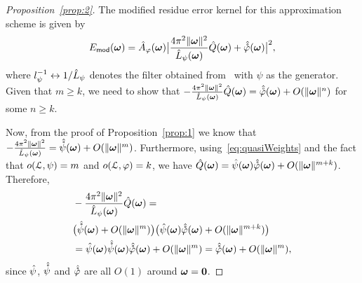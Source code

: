 \begin{proof}[Proposition~\ref{prop:2}]
  The modified residue error kernel for this approximation scheme is given by
  \begin{equation*}
    E_{\mathsf{mod}}(\boldsymbol{\omega}) = 
    \hat{A}_{\varphi}(\boldsymbol{\omega})
    \bigl\lvert
      \frac{4\pi^2 \lVert\boldsymbol{\omega}\rVert^2}{\hat{L}_\psi(\boldsymbol{\omega})}
      \hat{Q}(\boldsymbol{\omega})
      + 
      \hat{{\mathring{\varphi}}}(\boldsymbol{\omega})\bigr\rvert^2,
  \end{equation*}
  where $l_{\psi}^{-1} \leftrightarrow 1/\hat{L}_\psi$ denotes the filter
  obtained from~ with $\psi$ as the generator. Given that 
  $m \ge k$, we need to show that
  $-\frac{4\pi^2\lVert\boldsymbol{\omega}\rVert^2}{\hat{L}_\psi(\boldsymbol{\omega})}\hat{Q}(\boldsymbol{\omega})
  = \hat{{\mathring{\varphi}}}(\boldsymbol{\omega}) + O(\lVert\boldsymbol{\omega}\rVert^n)$
  for some $n \ge k$.

  Now, from the proof of Proposition~\ref{prop:1} we know that
  $-\frac{4\pi^2\lVert\boldsymbol{\omega}\rVert^2}{\hat{L}_\psi(\boldsymbol{\omega})} =
  \hat{{\mathring{\psi}}}(\boldsymbol{\omega}) +
  O(\lVert\boldsymbol{\omega}\rVert^m)$. Furthermore,
  using~\eqref{eq:quasiWeights} and the fact that $o(\mathcal{L},\psi) = m$
  and $o(\mathcal{L},\varphi) = k$, we have $\hat{Q}(\boldsymbol{\omega}) =
  \hat{\psi}(\boldsymbol{\omega})\hat{{\mathring{\varphi}}}(\boldsymbol{\omega}) +
  O(\lVert\boldsymbol{\omega}\rVert^{m+k})$. Therefore,
  \begin{equation*}
    \begin{split}
      & -\frac{4\pi^2 \lVert\boldsymbol{\omega}\rVert^2}{\hat{L}_\psi(\boldsymbol{\omega})}
      \hat{Q}(\boldsymbol{\omega}) =\\
      & \bigl(\hat{{\mathring{\psi}}}(\boldsymbol{\omega}) +
      O(\lVert\boldsymbol{\omega}\rVert^m)\bigr)
      \bigl(
      \hat{\psi}(\boldsymbol{\omega})\hat{{\mathring{\varphi}}}(\boldsymbol{\omega}) +
      O(\lVert\boldsymbol{\omega}\rVert^{m+k})
      \bigr)\\
      &= \hat{\psi}(\boldsymbol{\omega})
      \hat{{\mathring{\psi}}}(\boldsymbol{\omega})
      \hat{{\mathring{\varphi}}}(\boldsymbol{\omega}) + O(\lVert\boldsymbol{\omega}\rVert^m)
      =\hat{{\mathring{\varphi}}}(\boldsymbol{\omega}) + O(\lVert\boldsymbol{\omega}\rVert^m),
    \end{split}
  \end{equation*}
since $\hat{\psi}$, $\hat{{\mathring{\psi}}}$ and $\hat{{\mathring{\varphi}}}$ are all $O(1)$
around $\boldsymbol{\omega} = \boldsymbol{0}$.
\end{proof}

